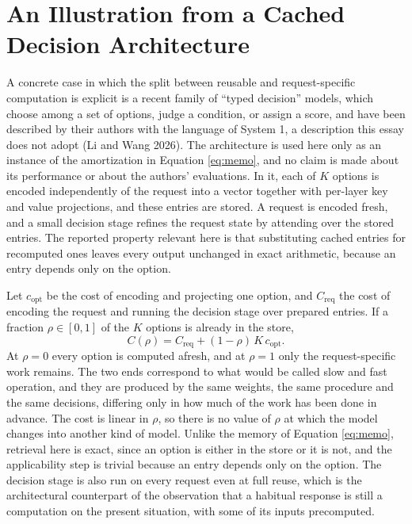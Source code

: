 \documentclass[11pt]{article}
\theoremstyle{definition}
\begin{document}
\section{An Illustration from a Cached Decision Architecture}

A concrete case in which the split between reusable and request-specific computation is explicit is a recent family of ``typed decision'' models, which choose among a set of options, judge a condition, or assign a score, and have been described by their authors with the language of System 1, a description this essay does not adopt (Li and Wang 2026). The architecture is used here only as an instance of the amortization in Equation \eqref{eq:memo}, and no claim is made about its performance or about the authors' evaluations. In it, each of $K$ options is encoded independently of the request into a vector together with per-layer key and value projections, and these entries are stored. A request is encoded fresh, and a small decision stage refines the request state by attending over the stored entries. The reported property relevant here is that substituting cached entries for recomputed ones leaves every output unchanged in exact arithmetic, because an entry depends only on the option.

Let $c_{\mathrm{opt}}$ be the cost of encoding and projecting one option, and $C_{\mathrm{req}}$ the cost of encoding the request and running the decision stage over prepared entries. If a fraction $\rho\in[0,1]$ of the $K$ options is already in the store,
\begin{equation}
C(\rho)=C_{\mathrm{req}}+(1-\rho)\,K\,c_{\mathrm{opt}} .
\end{equation}
At $\rho=0$ every option is computed afresh, and at $\rho=1$ only the request-specific work remains. The two ends correspond to what would be called slow and fast operation, and they are produced by the same weights, the same procedure and the same decisions, differing only in how much of the work has been done in advance. The cost is linear in $\rho$, so there is no value of $\rho$ at which the model changes into another kind of model. Unlike the memory of Equation \eqref{eq:memo}, retrieval here is exact, since an option is either in the store or it is not, and the applicability step is trivial because an entry depends only on the option. The decision stage is also run on every request even at full reuse, which is the architectural counterpart of the observation that a habitual response is still a computation on the present situation, with some of its inputs precomputed.
\end{document}
